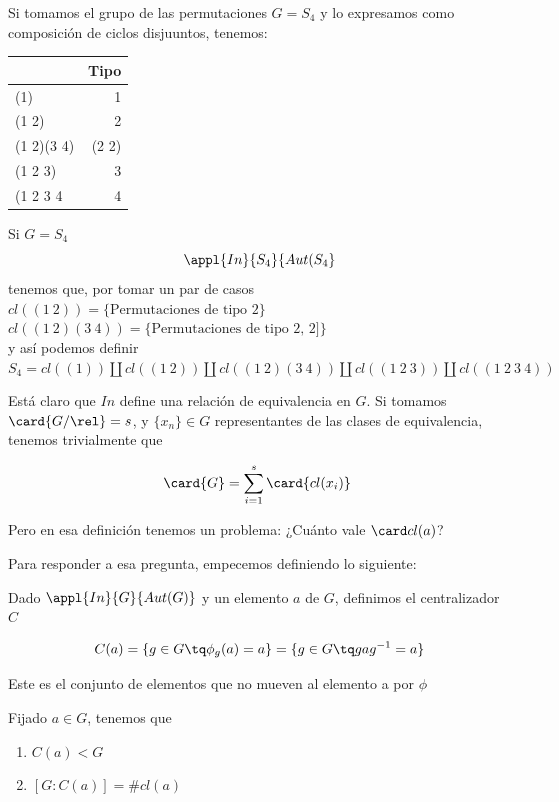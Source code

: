 \documentclass[nochap]{apuntes}
\begin{document}
\begin{example}
Si tomamos el grupo de las permutaciones $G=S_4$ y lo expresamos como composición de ciclos disjuuntos, tenemos:\\
\begin{center}
\begin{tabular}{|l|r|}
\hline
& Tipo\\ 
\hline
(1) & 1\\
(1 2) & 2\\
(1 2)(3 4) & (2 2)\\
(1 2 3) & 3\\
(1 2 3 4 & 4\\
\hline
\end{tabular}
\end{center}
Si $G=S_4$\\
$$\appl{In}{S_4}{Aut(S_4}$$
tenemos que, por tomar un par de casos
$cl((1\ 2)) = \{ \text{Permutaciones de tipo 2} \}$\\
$cl((1\ 2)(3\ 4)) = \{ \text{Permutaciones de tipo 2, 2]} \}$\\
y así podemos definir\\
$S_4 = cl((1)) \coprod cl((1\ 2)) \coprod cl((1\ 2)(3\ 4)) \coprod cl((1\ 2\ 3)) \coprod cl((1\ 2\ 3\ 4))$
\end{example}

Está claro que $In$ define una relación de equivalencia en $G$. Si tomamos $\card{G/\rel} = s$, y $\{x_n\}∈G$ representantes de las clases de equivalencia, tenemos trivialmente que 

\[ \card{G} = \sum_{i=1}^{s} \card{cl(x_i)} \]

Pero en esa definición tenemos un problema: ¿Cuánto vale $\card cl(a)$?

Para responder a esa pregunta, empecemos definiendo lo siguiente:

\begin{defn}[Centralizador] Dado $\appl{In}{G}{Aut(G)}$ y un elemento $a$ de $G$, definimos el centralizador $C$

\[ C(a) = \{ g\in G \tq \phi _g(a) = a\} = \{ g\in G \tq gag^{-1} = a\} \]

Este es el conjunto de elementos que no mueven al elemento a por $\phi$
\end{defn}

\begin{theorem}\label{thmConj1}
Fijado $a\in G$, tenemos que
\begin{enumerate}
\item $C(a) < G$
\item $[ G:C(a) ] = \# cl(a) $ 
\end{enumerate}
\end{theorem}
\end{document}
